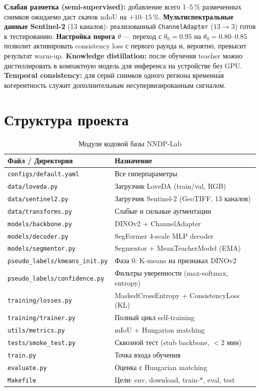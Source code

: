 \documentclass[11pt,a4paper]{article}
\begin{document}
\textbf{Слабая разметка (semi-supervised):} добавление всего 1--5\,\% размеченных
снимков ожидаемо даст скачок mIoU на $+10$--$15\,\%$. \textbf{Мультиспектральные
данные Sentinel-2} (13 каналов): реализованный \texttt{ChannelAdapter} ($13{\to}3$)
готов к тестированию. \textbf{Настройка порога $\theta$} --- переход с $\theta_0{=}0.95$ на
$\theta_0{=}0.80$--$0.85$ позволит активировать consistency loss с первого
раунда и, вероятно, превысит результат warm-up. \textbf{Knowledge distillation:} после обучения teacher
можно дистиллировать в компактную модель для инференса на устройстве без GPU.
\textbf{Temporal consistency:} для серий снимков одного региона временна́я когерентность
служит дополнительным несупервизированным сигналом.

\appendix
\section{Структура проекта}

\begin{table}[H]
\centering
\caption{Модули кодовой базы NNDP-Lab}
\label{tab:structure}
\small
\begin{tabularx}{\textwidth}{L{4.2cm} X}
  \toprule
  \textbf{Файл / Директория} & \textbf{Назначение} \\
  \midrule
  \texttt{configs/default.yaml}   & Все гиперпараметры \\
  \texttt{data/loveda.py}         & Загрузчик LoveDA (train/val, RGB) \\
  \texttt{data/sentinel2.py}      & Загрузчик Sentinel-2 (GeoTIFF, 13 каналов) \\
  \texttt{data/transforms.py}     & Слабые и сильные аугментации \\
  \texttt{models/backbone.py}     & DINOv2 + ChannelAdapter \\
  \texttt{models/decoder.py}      & SegFormer 4-scale MLP decoder \\
  \texttt{models/segmentor.py}    & Segmentor + MeanTeacherModel (EMA) \\
  \texttt{pseudo\_labels/kmeans\_init.py} & Фаза 0: K-means на признаках DINOv2 \\
  \texttt{pseudo\_labels/confidence.py}   & Фильтры уверенности (max-softmax, entropy) \\
  \texttt{training/losses.py}     & MaskedCrossEntropy + ConsistencyLoss (KL) \\
  \texttt{training/trainer.py}    & Полный цикл self-training \\
  \texttt{utils/metrics.py}       & mIoU + Hungarian matching \\
  \texttt{tests/smoke\_test.py}   & Сквозной тест (stub backbone, $<$2 мин) \\
  \texttt{train.py}               & Точка входа обучения \\
  \texttt{evaluate.py}            & Оценка с Hungarian matching \\
  \texttt{Makefile}               & Цели: env, download, train-*, eval, test \\
  \bottomrule
\end{tabularx}
\end{table}
\end{document}
